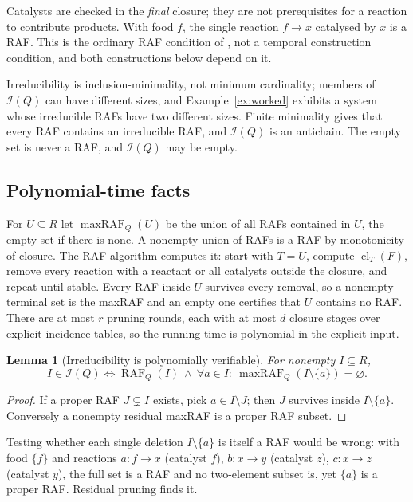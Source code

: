 \documentclass[11pt,a4paper]{article}
\theoremstyle{plain}
\newtheorem{lemma}[theorem]{Lemma}
\theoremstyle{definition}
\theoremstyle{remark}
\newcommand{\Irr}{\mathcal I}
\newcommand{\cl}{\operatorname{cl}}
\newcommand{\RAF}{\operatorname{RAF}}
\newcommand{\maxRAF}{\operatorname{maxRAF}}
\begin{document}
Catalysts are checked in the \emph{final} closure; they are not prerequisites for a reaction to contribute products. With food $f$, the single reaction $f\to x$ catalysed by $x$ is a RAF. This is the ordinary RAF condition of \cite{hordijk2004detecting}, not a temporal construction condition, and both constructions below depend on it.

Irreducibility is inclusion-minimality, not minimum cardinality; members of $\Irr(Q)$ can have different sizes, and Example~\ref{ex:worked} exhibits a system whose irreducible RAFs have two different sizes. Finite minimality gives that every RAF contains an irreducible RAF, and $\Irr(Q)$ is an antichain. The empty set is never a RAF, and $\Irr(Q)$ may be empty.

\subsection{Polynomial-time facts}

For $U\subseteq R$ let $\maxRAF_Q(U)$ be the union of all RAFs contained in $U$, the empty set if there is none. A nonempty union of RAFs is a RAF by monotonicity of closure. The RAF algorithm \cite{hordijk2004detecting} computes it: start with $T=U$, compute $\cl_T(F)$, remove every reaction with a reactant or all catalysts outside the closure, and repeat until stable. Every RAF inside $U$ survives every removal, so a nonempty terminal set is the maxRAF and an empty one certifies that $U$ contains no RAF. There are at most $r$ pruning rounds, each with at most $d$ closure stages over explicit incidence tables, so the running time is polynomial in the explicit input.

\begin{lemma}[Irreducibility is polynomially verifiable]\label{lem:irrtest}
For nonempty $I\subseteq R$,
\[
 I\in\Irr(Q)\iff \RAF_Q(I)\ \wedge\ \forall a\in I:\ \maxRAF_Q(I\setminus\{a\})=\varnothing .
\]
\end{lemma}
\begin{proof}
If a proper RAF $J\subsetneq I$ exists, pick $a\in I\setminus J$; then $J$ survives inside $I\setminus\{a\}$. Conversely a nonempty residual maxRAF is a proper RAF subset.
\end{proof}

Testing whether each single deletion $I\setminus\{a\}$ is itself a RAF would be wrong: with food $\{f\}$ and reactions $a\colon f\to x$ (catalyst $f$), $b\colon x\to y$ (catalyst $z$), $c\colon x\to z$ (catalyst $y$), the full set is a RAF and no two-element subset is, yet $\{a\}$ is a proper RAF. Residual pruning finds it.
\end{document}
